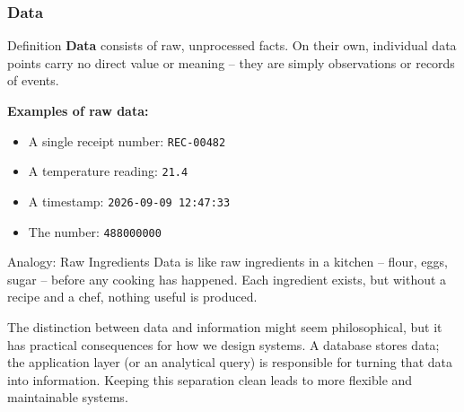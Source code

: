 \begin{frame}
  \frametitle{Data}

  \begin{block}{Definition}
    \textbf{Data} consists of raw, unprocessed facts. On their own, individual data points carry no direct value or meaning -- they are simply observations or records of events.
  \end{block}

  \vspace{0.5em}
  \textbf{Examples of raw data:}
  \begin{itemize}
    \item A single receipt number: \texttt{REC-00482}
    \item A temperature reading: \texttt{21.4}
    \item A timestamp: \texttt{2026-09-09 12:47:33}
    \item The number: \texttt{488000000}
  \end{itemize}

  \vspace{0.5em}
  \begin{examples}{Analogy: Raw Ingredients}
    Data is like raw ingredients in a kitchen -- flour, eggs, sugar -- before any cooking has happened. Each ingredient exists, but without a recipe and a chef, nothing useful is produced.
  \end{examples}

  The distinction between data and information might seem philosophical, but it has practical consequences for how we design systems. A database stores data; the application layer (or an analytical query) is responsible for turning that data into information. Keeping this separation clean leads to more flexible and maintainable systems.
\end{frame}


